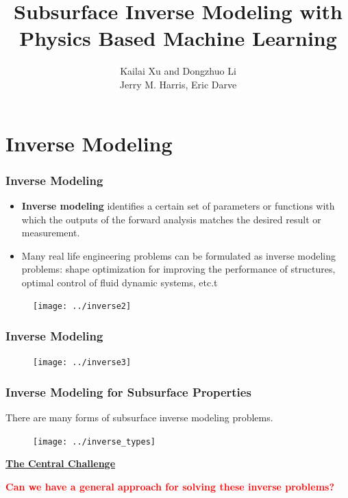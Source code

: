 \documentclass[usenames,dvipsnames]{beamer}
\title[Physics Constrained Learning]{Subsurface Inverse Modeling with Physics Based Machine Learning} %
\author[Kailai Xu, et al.]{Kailai Xu and Dongzhuo Li\\ Jerry M. Harris,  Eric Darve}%
\date{}%
\begin{document}
\begin{frame}

\titlepage %


\end{frame}
\usebackgroundtemplate{}

\section{Inverse Modeling}



\begin{frame}
	\frametitle{Inverse Modeling}
	\begin{itemize}
		\item \textbf{Inverse modeling} identifies a certain set of parameters or functions with which the outputs of the forward analysis matches the desired result or measurement.
		\item Many real life engineering problems can be formulated as inverse modeling problems: shape optimization for improving the performance of structures, optimal control of fluid dynamic systems, etc.t
	\end{itemize}
	\begin{figure}[hbt]
	\centering
  \texttt{[image: ../inverse2]}
\end{figure}
\end{frame}

\begin{frame}
	\frametitle{Inverse Modeling}
	\begin{figure}
	\centering
  \texttt{[image: ../inverse3]}
\end{figure}
\end{frame}

\begin{frame}
	\frametitle{Inverse Modeling for Subsurface Properties}
	 
	 There are many forms of subsurface inverse modeling problems.
	 
	 	\begin{figure}
	 	\centering
	 	\texttt{[image: ../inverse\_types]}
	 \end{figure}

\begin{center}
	\textbf{\underline{The Central Challenge}}
\end{center}	 
	\begin{center}
\textcolor{red}{\textbf{Can we have a general approach for solving these inverse problems?}}
\end{center}

\end{frame}
\end{document}
